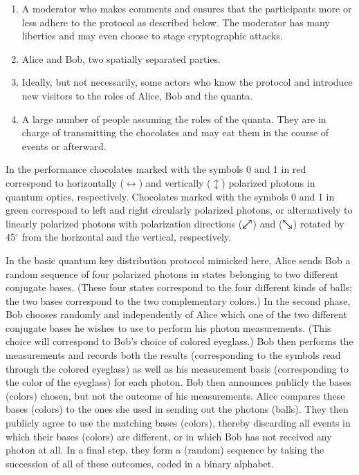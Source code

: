 \documentclass[prb,amssymb,preprint]{revtex4}
\def\ddarrow{{\swarrow\mkern-18mu\nearrow}}
\def\cddarrow{{\searrow\mkern-18mu\nwarrow}}
\begin{document}
\begin{enumerate}

\item A moderator who makes comments and ensures that the participants more
or less adhere to the protocol as described below. The moderator has many
liberties and may even choose to stage cryptographic attacks.

\item Alice and Bob, two spatially separated parties.

\item Ideally, but not necessarily, some actors who know the protocol and
introduce new visitors to the roles of Alice, Bob and the quanta.

\item A large number of people assuming the roles of the quanta. They are in
charge of transmitting the chocolates and may eat them in the course of
events or afterward.

\end{enumerate}

In the performance chocolates marked with the symbols 0 and 1 in red
correspond to horizontally
($\leftrightarrow$) and vertically ($\updownarrow$) polarized photons in
quantum optics, respectively. Chocolates marked with the symbols
0 and 1 in green correspond to left and right circularly polarized
photons, or alternatively to linearly polarized photons with polarization
directions ($\ddarrow$) and ($\cddarrow$) rotated by 45$^\circ$
from the horizontal and the vertical, respectively.

In the basic quantum key distribution protocol mimicked here, Alice sends
Bob a random sequence of four polarized photons in states belonging to two
different conjugate bases. (These four states correspond to the four
different kinds of balls; the two bases correspond to
the two complementary colors.) In the second phase, Bob chooses randomly and
independently of Alice which one of the two different conjugate bases he
wishes to use to perform his photon measurements. (This choice
will correspond to Bob's choice of colored eyeglass.) Bob then performs the
measurements and records both the results (corresponding to the symbols read
through the colored eyeglass) as well as his measurement basis
(corresponding to the color of the eyeglass) for each photon. Bob
then announces publicly the bases (colors) chosen, but not the outcome of
his measurements. Alice compares these bases (colors) to the ones she used
in sending out the photons (balls). They then publicly agree to use the
matching bases (colors), thereby discarding all events in which their bases
(colors) are different, or in which Bob has not received any photon at all.
In a final step, they form a (random) sequence by taking the succession of
all of these outcomes,
coded in a binary alphabet.
\end{document}
